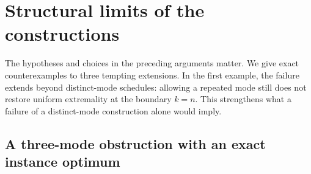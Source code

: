 \section{Structural limits of the constructions}\label{sec:structural-limits}

The hypotheses and choices in the preceding arguments matter. We give
exact counterexamples to three tempting extensions. In the first example,
the failure extends beyond distinct-mode schedules: allowing a repeated
mode still does not restore uniform extremality at the boundary $k=n$.
This strengthens what a failure of a distinct-mode construction alone
would imply.

\subsection{A three-mode obstruction with an exact instance optimum}

